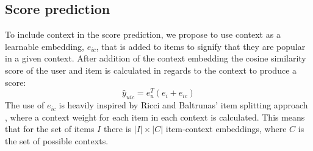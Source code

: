 \subsection{Score prediction}\label{subsec:csgcn_is_score_prediction}
To include context in the score prediction, we propose to use context as a learnable embedding, $e_{ic}$, that is added to items to signify that they are popular in a given context.
After addition of the context embedding the cosine similarity score of the user and item is calculated in regards to the context to produce a score:
\begin{equation}
  \hat{y}_{uic} = e_u^T(e_i+e_{ic})
\end{equation}
The use of $e_{ic}$ is heavily inspired by Ricci and Baltrunas' item splitting approach \cite{baltrunasitemsplitting}, where a context weight for each item in each context is calculated.
This means that for the set of items $I$ there is $|I| \times |C|$ item-context embeddings, where $C$ is the set of possible contexts.

